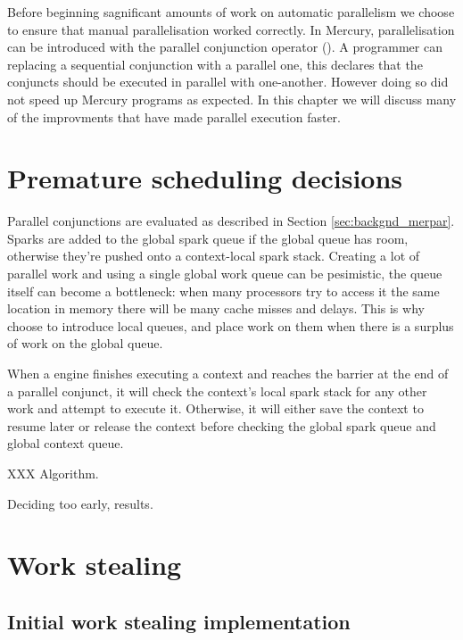 

Before beginning sagnificant amounts of work on automatic parallelism we
choose to ensure that manual parallelisation worked correctly.
In Mercury, parallelisation can be introduced with the parallel conjunction
operator (\code{\&}).
A programmer can replacing a sequential conjunction with a parallel one,
this declares that the conjuncts should be executed in parallel with
one-another.
However doing so did not speed up Mercury programs as expected.
In this chapter we will discuss many of the improvments that have made
parallel execution faster.

\section{Premature scheduling decisions}

Parallel conjunctions are evaluated as described in Section
\ref{sec:backgnd_merpar}.
Sparks are added to the global spark queue if the global queue has room,
otherwise they're pushed onto a context-local spark stack.
Creating a lot of parallel work and using a single global work queue can be
pesimistic,
the queue itself can become a bottleneck:
when many processors try to access it the same location in memory there will
be many cache misses and delays.
This is why \citet{wang-hons} choose to introduce local queues,
and place work on them when there is a surplus of work on the global queue.

When a engine finishes executing a context and reaches the barrier at the
end of a parallel conjunct,
it will check the context's local spark stack for any other work and attempt
to execute it.
Otherwise, it will either save the context to resume later or release the
context before checking the global spark queue and global context queue.

XXX Algorithm.

Deciding too early, results.


\section{Work stealing}

\subsection{Initial work stealing implementation}

